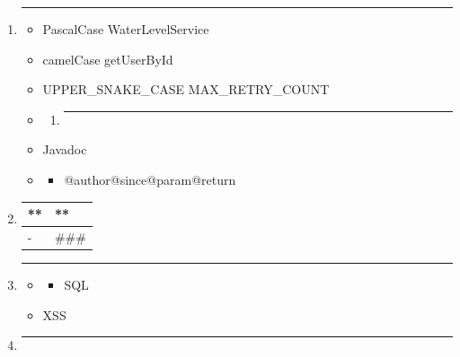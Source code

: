 \begin{enumerate}
\def\labelenumi{\arabic{enumi}.}
\item
  \begin{center}\rule{0.5\linewidth}{0.5pt}\end{center}

  \begin{itemize}
  \item
    PascalCase WaterLevelService
  \item
    camelCase getUserById
  \item
    UPPER\_SNAKE\_CASE MAX\_RETRY\_COUNT
  \item
    \begin{enumerate}
    \def\labelenumii{\arabic{enumii}.}
        \item
      \begin{center}\rule{0.5\linewidth}{0.5pt}\end{center}
    \end{enumerate}
  \item
    Javadoc
  \item
    \begin{itemize}
    \tightlist
    \item
      @author@since@param@return
    \end{itemize}
  \end{itemize}
\item
  \begin{longtable}[]{@{}ll@{}}
  \toprule\noalign{}
  ** & ** \\
  \midrule\noalign{}
  \endhead
  \bottomrule\noalign{}
  \endlastfoot
  - & \#\#\# \\
  \end{longtable}
\item
  \begin{center}\rule{0.5\linewidth}{0.5pt}\end{center}

  \begin{itemize}
  \tightlist
  \item
    \begin{itemize}
    \tightlist
    \item
      SQL
    \end{itemize}
  \item
    XSS
  \end{itemize}
\item
  \begin{center}\rule{0.5\linewidth}{0.5pt}\end{center}


\end{enumerate}
